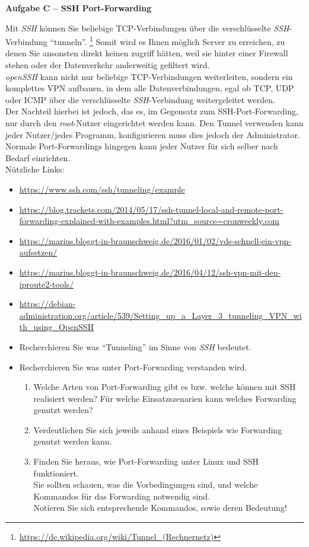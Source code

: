 \documentclass[paper=a4,fontsize=11pt]{scrartcl}%
\numberwithin{equation}{section}
\begin{document}
\begin{center}\Large{\textbf{Aufgabe C -- SSH Port-Forwarding}}\end{center}\vskip0.25in
Mit \emph{SSH} können Sie beliebige TCP-Verbindungen über die verschlüsselte \emph{SSH}-Verbindung \enquote{tunneln}. \footnote{\url{https://de.wikipedia.org/wiki/Tunnel_(Rechnernetz)}} Somit wird es Ihnen möglich Server zu erreichen, zu denen Sie ansonsten direkt keinen zugriff hätten, weil sie hinter einer Firewall stehen oder der Datenverkehr anderweitig gefiltert wird.\\
\emph{openSSH} kann nicht nur beliebige TCP-Verbindungen weiterleiten, sondern ein komplettes VPN aufbauen, in dem alle Datenverbindungen, egal ob TCP, UDP oder ICMP über die verschlüsselte \emph{SSH}-Verbindung weitergeleitet werden.\\
Der Nachteil hierbei ist jedoch, das es, im Gegensatz zum SSH-Port-Forwarding, nur durch den \emph{root}-Nutzer eingerichtet werden kann. Den Tunnel verwenden kann jeder Nutzer/jedes Programm, konfigurieren muss dies jedoch der Administrator. Normale Port-Forwardings hingegen kann jeder Nutzer für sich selber nach Bedarf einrichten.\\
Nützliche Links:
\begin{itemize}
	\item \url{https://www.ssh.com/ssh/tunneling/example}
	\item \url{https://blog.trackets.com/2014/05/17/ssh-tunnel-local-and-remote-port-forwarding-explained-with-examples.html?utm_source=cronweekly.com}
	\item \url{https://marius.bloggt-in-braunschweig.de/2016/01/02/vds-schnell-ein-vpn-aufsetzen/}
	\item \url{https://marius.bloggt-in-braunschweig.de/2016/04/12/ssh-vpn-mit-den-iproute2-tools/}
	\item \url{https://debian-administration.org/article/539/Setting_up_a_Layer_3_tunneling_VPN_with_using_OpenSSH}
\end{itemize}
\begin{itemize}
	\item Recherchieren Sie was \enquote{Tunneling} im Sinne von \emph{SSH}  bedeutet.
	\item Recherchieren Sie was unter Port-Forwarding verstanden wird.\\
	\begin{enumerate}
		\item Welche Arten von Port-Forwarding gibt es bzw. welche können mit SSH realisiert werden? Für welche Einsatzszenarien kann welches Forwarding genutzt werden?
		\item Verdeutlichen Sie sich jeweils anhand eines Beispiels wie Forwarding genutzt werden kann.
		\item Finden Sie heraus, wie Port-Forwarding unter Linux und SSH funktioniert.\\
		Sie sollten schauen, was die Vorbedingungen sind, und welche Kommandos für das Forwarding notwendig sind.\\
		Notieren Sie sich entsprechende Kommandos, sowie deren Bedeutung!
	\end{enumerate}
\end{itemize}
\end{document}
